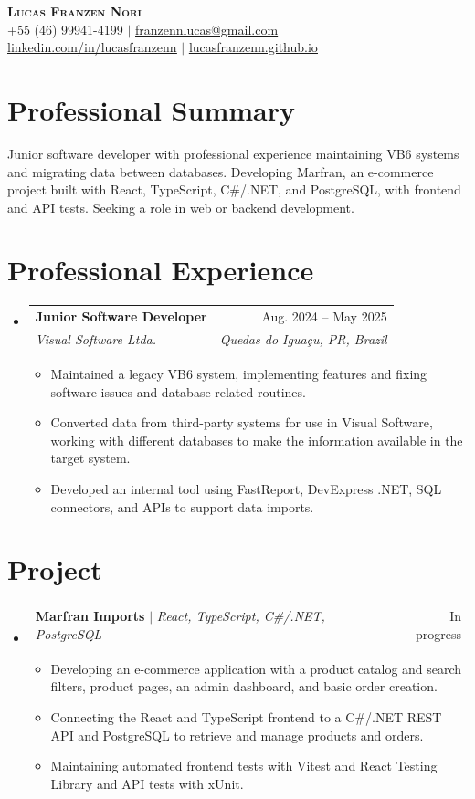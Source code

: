 \documentclass[letterpaper,11pt]{article}
\newcommand{\resumeItem}[1]{
  \item\small{
    {#1 \vspace{-2pt}}
  }
}
\newcommand{\resumeSubheading}[4]{
  \vspace{-2pt}\item
    \begin{tabularx}{0.97\textwidth}[t]{>{\raggedright\arraybackslash}X r}
      \textbf{#1} & #2 \\
      \textit{\small#3} & \textit{\small #4} \\
    \end{tabularx}\vspace{-7pt}
}
\newcommand{\resumeProjectHeading}[2]{
    \item
    \begin{tabularx}{0.97\textwidth}{>{\raggedright\arraybackslash}X r}
      \small#1 & #2 \\
    \end{tabularx}\vspace{-7pt}
}
\newcommand{\resumeSubHeadingListStart}{\begin{itemize}[leftmargin=0.15in, label={}]}
\newcommand{\resumeSubHeadingListEnd}{\end{itemize}}
\newcommand{\resumeItemListStart}{\begin{itemize}}
\newcommand{\resumeItemListEnd}{\end{itemize}\vspace{-5pt}}
\begin{document}
\begin{center}
    \textbf{\Huge \scshape Lucas Franzen Nori} \\ \vspace{1pt}
    \small +55 (46) 99941-4199 $|$
    \href{mailto:franzennlucas@gmail.com}{\underline{franzennlucas@gmail.com}} \\ \vspace{1pt}
    \href{https://linkedin.com/in/lucasfranzenn}{\underline{linkedin.com/in/lucasfranzenn}} $|$
    \href{https://lucasfranzenn.github.io/}{\underline{lucasfranzenn.github.io}}
\end{center}

\section{Professional Summary}
\small{Junior software developer with professional experience maintaining VB6 systems and migrating data between databases. Developing Marfran, an e-commerce project built with React, TypeScript, C\#/.NET, and PostgreSQL, with frontend and API tests. Seeking a role in web or backend development.}

\section{Professional Experience}
  \resumeSubHeadingListStart
    \resumeSubheading
      {Junior Software Developer}{Aug. 2024 -- May 2025}
      {Visual Software Ltda.}{Quedas do Igua\c{c}u, PR, Brazil}
      \resumeItemListStart
        \resumeItem{Maintained a legacy VB6 system, implementing features and fixing software issues and database-related routines.}
        \resumeItem{Converted data from third-party systems for use in Visual Software, working with different databases to make the information available in the target system.}
        \resumeItem{Developed an internal tool using FastReport, DevExpress .NET, SQL connectors, and APIs to support data imports.}
      \resumeItemListEnd
  \resumeSubHeadingListEnd

\section{Project}
  \resumeSubHeadingListStart
    \resumeProjectHeading
      {\textbf{Marfran Imports} $|$ \emph{React, TypeScript, C\#/.NET, PostgreSQL}}{In progress}
      \resumeItemListStart
        \resumeItem{Developing an e-commerce application with a product catalog and search filters, product pages, an admin dashboard, and basic order creation.}
        \resumeItem{Connecting the React and TypeScript frontend to a C\#/.NET REST API and PostgreSQL to retrieve and manage products and orders.}
        \resumeItem{Maintaining automated frontend tests with Vitest and React Testing Library and API tests with xUnit.}
      \resumeItemListEnd
  \resumeSubHeadingListEnd
\end{document}
